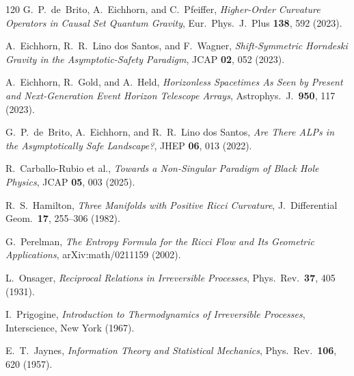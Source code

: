 \documentclass[12pt,a4paper]{article}
\begin{document}
\begin{thebibliography}{120}
G.~P.~de~Brito, A.~Eichhorn, and C.~Pfeiffer,
\textit{Higher-Order Curvature Operators in Causal Set Quantum Gravity},
Eur.\ Phys.\ J.\ Plus \textbf{138}, 592 (2023).

A.~Eichhorn, R.~R.~Lino dos Santos, and F.~Wagner,
\textit{Shift-Symmetric Horndeski Gravity in the Asymptotic-Safety Paradigm},
JCAP \textbf{02}, 052 (2023).

A.~Eichhorn, R.~Gold, and A.~Held,
\textit{Horizonless Spacetimes As Seen by Present and Next-Generation
Event Horizon Telescope Arrays},
Astrophys.\ J.\ \textbf{950}, 117 (2023).

G.~P.~de~Brito, A.~Eichhorn, and R.~R.~Lino dos Santos,
\textit{Are There ALPs in the Asymptotically Safe Landscape?},
JHEP \textbf{06}, 013 (2022).

R.~Carballo-Rubio et al.,
\textit{Towards a Non-Singular Paradigm of Black Hole Physics},
JCAP \textbf{05}, 003 (2025).


R.~S.~Hamilton,
\textit{Three Manifolds with Positive Ricci Curvature},
J.\ Differential Geom.\ \textbf{17}, 255--306 (1982).

G.~Perelman,
\textit{The Entropy Formula for the Ricci Flow and Its Geometric Applications},
arXiv:math/0211159 (2002).


L.~Onsager,
\textit{Reciprocal Relations in Irreversible Processes},
Phys.\ Rev.\ \textbf{37}, 405 (1931).

I.~Prigogine,
\textit{Introduction to Thermodynamics of Irreversible Processes},
Interscience, New York (1967).

E.~T.~Jaynes,
\textit{Information Theory and Statistical Mechanics},
Phys.\ Rev.\ \textbf{106}, 620 (1957).

\end{thebibliography}
\end{document}
